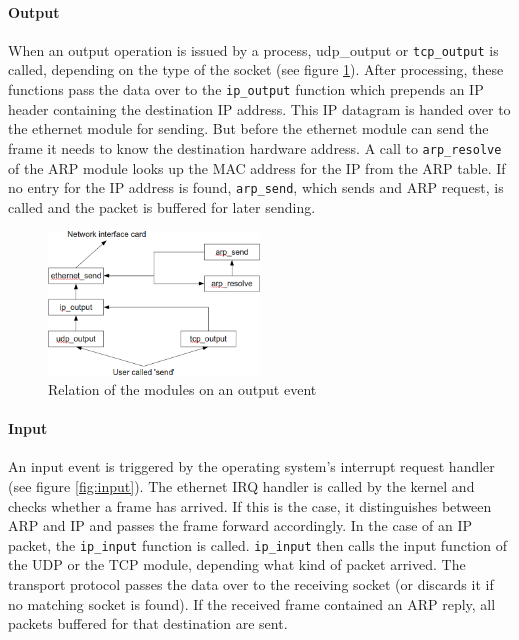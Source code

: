 \documentclass[11pt,twoside,abstract,notitlepage]{scrreprt}
\begin{document}
\paragraph{Output} When an output operation is issued by a process, udp\_output or \texttt{tcp\_output} is called, depending on the type of the socket (see figure \ref{fig:output}). After processing, these functions pass the data over to the \texttt{ip\_output} function which prepends an IP header containing the destination IP address. This IP datagram is handed over to the ethernet module for sending. But before the ethernet module can send the frame it needs to know the destination hardware address. A call to \texttt{arp\_resolve} of the ARP module looks up the MAC address for the IP from the ARP table. If no entry for the IP address is found, \texttt{arp\_send}, which sends and ARP request, is called and the packet is buffered for later sending.
\begin{figure}
\caption{Relation of the modules on an output event}
\vspace{0.3cm}
\label{fig:output}
\normalsize
\centerline{\includegraphics[width=0.5\textwidth]{images/output.png}}
\end{figure}



\paragraph{Input} An input event is triggered by the operating system's interrupt request handler (see figure \ref{fig:input}). The ethernet IRQ handler is called by the kernel and checks whether a frame has arrived. If this is the case, it distinguishes between ARP and IP and passes the frame forward accordingly. In the case of an IP packet, the \texttt{ip\_input} function is called. \texttt{ip\_input} then calls the input function of the UDP or the TCP module, depending what kind of packet arrived. The transport protocol passes the data over to the receiving socket (or discards it if no matching socket is found). If the received frame contained an ARP reply, all packets buffered for that destination are sent.
\end{document}
